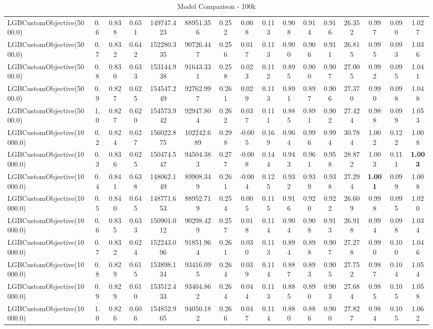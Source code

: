 \documentclass[11pt]{article}
\theoremstyle{plain}
\theoremstyle{definition}
\newcommand{\1}{\mathbf{1}}
\begin{document}
\begin{table}[h]
{\begin{tabular}{lccccccccccccccc}
LGBCustomObjective(5000.0) & 0.6 & 0.838 & 0.651 & 149747.423 & 88951.356 & 0.252 & 0.008 & 0.113 & 0.908 & 0.914 & 0.916 & 26.352 & 0.997 & 0.090 & 1.027 \\
LGBCustomObjective(5000.0) & 0.7 & 0.832 & 0.642 & 152280.335 & 90726.447 & 0.256 & 0.017 & 0.113 & 0.900 & 0.906 & 0.911 & 26.815 & 0.995 & 0.093 & 1.036 \\
LGBCustomObjective(5000.0) & 0.8 & 0.830 & 0.633 & 153144.938 & 91643.331 & 0.258 & 0.023 & 0.112 & 0.895 & 0.900 & 0.907 & 27.005 & 0.992 & 0.095 & 1.041 \\
LGBCustomObjective(5000.0) & 0.9 & 0.827 & 0.625 & 154547.249 & 92762.997 & 0.261 & 0.029 & 0.113 & 0.891 & 0.897 & 0.906 & 27.370 & 0.990 & 0.098 & 1.048 \\
LGBCustomObjective(5000.0) & 1.0 & 0.827 & 0.620 & 154573.942 & 92947.804 & 0.262 & 0.037 & 0.111 & 0.885 & 0.891 & 0.902 & 27.424 & 0.988 & 0.099 & 1.053 \\
LGBCustomObjective(10000.0) & 0.2 & 0.824 & 0.627 & 156022.875 & 102242.689 & 0.298 & -0.005 & 0.169 & 0.964 & 0.996 & 0.994 & 30.784 & 1.002 & 0.122 & 1.008 \\
LGBCustomObjective(10000.0) & 0.3 & 0.836 & 0.625 & 150474.547 & 94504.383 & 0.277 & -0.008 & 0.144 & 0.943 & 0.961 & 0.958 & 28.872 & 1.003 & 0.111 & \textbf{1.003} \\
LGBCustomObjective(10000.0) & 0.4 & 0.841 & 0.638 & 148062.149 & 89908.349 & 0.261 & -0.004 & 0.125 & 0.932 & 0.939 & 0.938 & 27.294 & \textbf{1.001} & 0.099 & 1.008 \\
LGBCustomObjective(10000.0) & 0.5 & 0.840 & 0.645 & 148771.653 & 88952.719 & 0.254 & 0.005 & 0.115 & 0.916 & 0.920 & 0.922 & 26.609 & 0.998 & 0.095 & 1.020 \\
LGBCustomObjective(10000.0) & 0.6 & 0.835 & 0.633 & 150901.012 & 90298.429 & 0.257 & 0.018 & 0.114 & 0.904 & 0.908 & 0.913 & 26.918 & 0.994 & 0.098 & 1.034 \\
LGBCustomObjective(10000.0) & 0.7 & 0.832 & 0.624 & 152243.096 & 91851.964 & 0.261 & 0.030 & 0.113 & 0.894 & 0.898 & 0.907 & 27.278 & 0.990 & 0.100 & 1.046 \\
LGBCustomObjective(10000.0) & 0.8 & 0.829 & 0.615 & 153898.134 & 93416.095 & 0.264 & 0.039 & 0.114 & 0.887 & 0.893 & 0.905 & 27.752 & 0.987 & 0.104 & 1.054 \\
LGBCustomObjective(10000.0) & 0.9 & 0.829 & 0.610 & 153512.433 & 93404.862 & 0.264 & 0.044 & 0.113 & 0.885 & 0.890 & 0.903 & 27.684 & 0.985 & 0.105 & 1.058 \\
LGBCustomObjective(10000.0) & 1.0 & 0.826 & 0.606 & 154852.965 & 94050.182 & 0.266 & 0.047 & 0.114 & 0.880 & 0.886 & 0.900 & 27.827 & 0.984 & 0.105 & 1.062 \\
\bottomrule
\end{tabular}%
}
\caption{Model Comparison - 100k}
\end{table}
\end{document}
